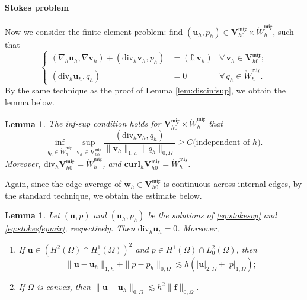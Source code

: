 \documentclass[12pt,showkeys]{amsart}
\newtheorem{lemma}[theorem]{Lemma}
\begin{document}
\paragraph{\textbf{Stokes problem}} Now we consider the finite element problem: find $(\mathbf{u}_h,p_h)\in\mathbf{V}_{h0}^{\mathfrak{mix}}\times \mathring{W}_h^{\mathfrak{mix}}$, such that
\begin{equation}\label{eq:stokesfepmix}
\left\{
\begin{array}{rll}
(\nabla_h\mathbf{u}_h,\nabla\mathbf{v}_h)+(\mathrm{div}_h\mathbf{v}_h,p_h)&=(\mathbf{f},\mathbf{v}_h) & \forall\,\mathbf{v}_h\in \mathbf{V}_{h0}^{\mathfrak{mix}}; \\ 
(\mathrm{div}_h\mathbf{u}_h,q_h)&=0 & \forall\,q_h\in \mathring{W}_h^{\mathfrak{mix}}.
\end{array}
\right.
\end{equation}
By the same technique as the proof of Lemma \ref{lem:discinfsup}, we obtain the lemma below.
\begin{lemma}
The inf-sup condition holds for $\mathbf{V}_{h0}^{\mathfrak{mix}}\times \mathring{W}_h^{\mathfrak{mix}}$ that
\begin{equation}\label{eq:discinfsupmix}
\inf_{q_h\in \mathring{W}_h^{\mathfrak{mix}}}\sup_{\mathbf{v}_h\in \mathbf{V}_{h0}^{\mathfrak{mix}}}\frac{(\mathrm{div}_h \mathbf{v}_h,q_h)}{\|\mathbf{v}_h\|_{1,h}\|q_h\|_{0,\Omega}}\geqslant C \mbox{(independent of $h$)}.
\end{equation}
Moreover, $\mathrm{div}_h\mathbf{V}_{h0}^{\mathfrak{mix}}=\mathring{W}_h^{\mathfrak{mix}}$, and $\mathbf{curl}_h\mathbf{V}_{h0}^{\mathfrak{mix}}=\mathring{W}_h^{\mathfrak{mix}}$.
\end{lemma}

Again, since the edge average of $\mathbf{w}_h\in \mathbf{V}_{h0}^{\mathfrak{mix}}$ is continuous across internal edges, by the standard technique, we obtain the estimate below.
\begin{lemma}
Let $(\mathbf{u},p)$ and $(\mathbf{u}_h,p_h)$ be the solutions of \eqref{eq:stokesvp} and \eqref{eq:stokesfepmix}, respectively. Then $\mathrm{div}_h\mathbf{u}_h=0$. Moreover,
\begin{enumerate}
\item If $\mathbf{u}\in (H^2(\Omega)\cap H^1_0(\Omega))^2$ and $p\in H^1(\Omega)\cap L^2_0(\Omega)$, then 
$$
\|\textbf{u}-\textbf{u}_h\|_{1,h}+\|p-p_h\|_{0,\Omega}\lesssim h(|\textbf{u}|_{2,\Omega}+|p|_{1,\Omega});
$$
\item If $\Omega$ is convex, then $\|\textbf{u}-\textbf{u}_h\|_{0,\Omega}\lesssim h^2\|\mathbf{f}\|_{0,\Omega}$.
\end{enumerate}
\end{lemma}
\end{document}

